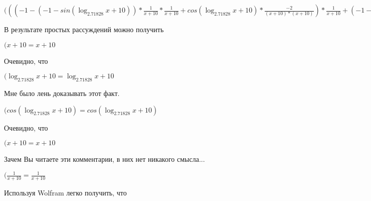 \documentclass[12pt,a4paper,fleqn]{article}
\theoremstyle{definition}
\begin{document}
$((( -1  - ( -1  - sin(\log_{ 2.71828 }{ x  +  10 })) * \frac{ 1 }{ x  +  10 }
 * \frac{ 1 }{ x  +  10 }
 + cos(\log_{ 2.71828 }{ x  +  10 }) * \frac{ -2 }{( x  +  10 ) * ( x  +  10 )}
) * \frac{ 1 }{ x  +  10 }
 + ( -1  - cos(\log_{ 2.71828 }{ x  +  10 }) * \frac{ 1 }{ x  +  10 }
) * \frac{ -2 }{( x  +  10 ) * ( x  +  10 )}
 + ( -1  - cos(\log_{ 2.71828 }{ x  +  10 }) * \frac{ 1 }{ x  +  10 }
) * \frac{ -2 }{( x  +  10 ) * ( x  +  10 )}
 + ( -1  - sin(\log_{ 2.71828 }{ x  +  10 })) * \frac{ -1  -  -2  * ( x  +  10  +  x  +  10 )}{( x  +  10 ) * ( x  +  10 ) * ( x  +  10 ) * ( x  +  10 )}
) * \frac{ 1 }{ x  +  10 }
 + (( -1  - cos(\log_{ 2.71828 }{ x  +  10 }) * \frac{ 1 }{ x  +  10 }
) * \frac{ 1 }{ x  +  10 }
 + ( -1  - sin(\log_{ 2.71828 }{ x  +  10 })) * \frac{ -2 }{( x  +  10 ) * ( x  +  10 )}
) * \frac{ -2 }{( x  +  10 ) * ( x  +  10 )}
 = (( -1  - ( -1  - sin(\log_{ 2.71828 }{ x  +  10 })) * \frac{ 1 }{ x  +  10 }
 * \frac{ 1 }{ x  +  10 }
 + cos(\log_{ 2.71828 }{ x  +  10 }) * \frac{ -2 }{( x  +  10 ) * ( x  +  10 )}
) * \frac{ 1 }{ x  +  10 }
 + ( -1  - cos(\log_{ 2.71828 }{ x  +  10 }) * \frac{ 1 }{ x  +  10 }
) * \frac{ -2 }{( x  +  10 ) * ( x  +  10 )}
 + ( -1  - cos(\log_{ 2.71828 }{ x  +  10 }) * \frac{ 1 }{ x  +  10 }
) * \frac{ -2 }{( x  +  10 ) * ( x  +  10 )}
 + ( -1  - sin(\log_{ 2.71828 }{ x  +  10 })) * \frac{ -1  -  -2  * ( x  +  10  +  x  +  10 )}{( x  +  10 ) * ( x  +  10 ) * ( x  +  10 ) * ( x  +  10 )}
) * \frac{ 1 }{ x  +  10 }
 + (( -1  - cos(\log_{ 2.71828 }{ x  +  10 }) * \frac{ 1 }{ x  +  10 }
) * \frac{ 1 }{ x  +  10 }
 + ( -1  - sin(\log_{ 2.71828 }{ x  +  10 })) * \frac{ -2 }{( x  +  10 ) * ( x  +  10 )}
) * \frac{ -2 }{( x  +  10 ) * ( x  +  10 )}
$

В результате простых рассуждений можно получить

$( x  +  10  =  x  +  10 $

Очевидно, что

$(\log_{ 2.71828 }{ x  +  10 } = \log_{ 2.71828 }{ x  +  10 }$

Мне было лень доказывать этот факт.

$(cos(\log_{ 2.71828 }{ x  +  10 }) = cos(\log_{ 2.71828 }{ x  +  10 })$

Очевидно, что

$( x  +  10  =  x  +  10 $

Зачем Вы читаете эти комментарии, в них нет никакого смысла...

$(\frac{ 1 }{ x  +  10 }
 = \frac{ 1 }{ x  +  10 }
$

Используя Wolfram легко получить, что
\end{document}
